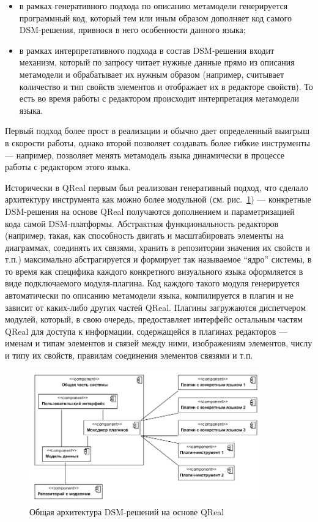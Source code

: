 \documentclass[a4, 12pt]{article}
\begin{document}
\begin{itemize}
 \item в рамках генеративного подхода по описанию метамодели генерируется программный код, который тем или иным образом дополняет код самого DSM-решения, привнося в него особенности данного языка;
 \item в рамках интерпретативного подхода в состав DSM-решения входит механизм, который по запросу читает нужные данные прямо из описания метамодели и обрабатывает их нужным образом (например, считывает количество и тип свойств элементов и отображает их в редакторе свойств). То есть во время работы с редактором происходит интерпретация метамодели языка.
\end{itemize}

Первый подход более прост в реализации и обычно дает определенный выигрыш в скорости работы, однако второй позволяет создавать более гибкие инструменты --- например, позволяет менять метамодель языка динамически в процессе работы с редактором этого языка.

Исторически в QReal первым был реализован генеративный подход, что сделало архитектуру инструмента как можно более модульной (см. рис.~\ref{fig1}) --- конкретные DSM-решения на основе QReal получаются дополнением и параметризацией кода самой DSM-платформы. Абстрактная функциональность редакторов (например, такая, как способность двигать и масштабировать элементы на диаграммах, соединять их связями, хранить в репозитории значения их свойств и т.п.) максимально абстрагируется и формирует так называемое ``ядро'' системы, в то время как специфика каждого конкретного визуального языка оформляется в виде подключаемого модуля-плагина. Код каждого такого модуля генерируется автоматически по описанию метамодели языка, компилируется в плагин и не зависит от каких-либо других частей QReal. Плагины загружаются диспетчером модулей, который, в свою очередь, предоставляет интерфейс остальным частям QReal для доступа к информации, содержащейся в плагинах редакторов --- именам и типам элементов и связей между ними, 
изображениям элементов, числу и типу их свойств, правилам соединения элементов связями и т.п.

\begin{figure} [ht]
  \begin{center}
    \includegraphics[width=0.9\textwidth]{fig1-architecture-overview.png}
    \caption{Общая архитектура DSM-решений на основе QReal}
    \label{fig1}
  \end{center}
\end{figure}
\end{document}
